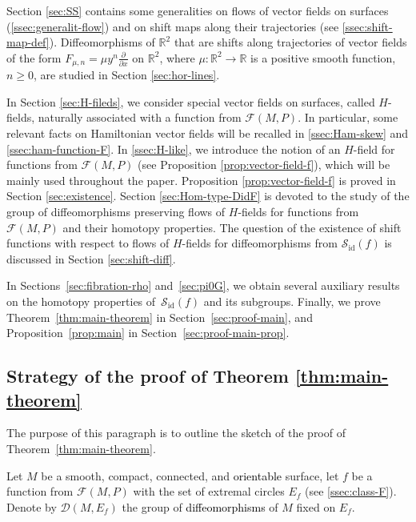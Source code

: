 \documentclass[10pt,reqno]{amsart}
\newcommand{\bbR}{\mathbb{R}}
\newcommand{\Sid}{\mathcal{S}_{\id}(f)}
\newcommand{\F}{\mathcal{F}(M,P)}
\newcommand{\id}{\mathrm{id}}
\newcommand{\textr}[1]{\textcolor{black}{#1}}
\begin{document}
Section \ref{sec:SS} contains some generalities on  flows of vector fields on surfaces (\textsection\ref{ssec:generalit-flow}) and on shift maps along their trajectories (see \textsection\ref{ssec:shift-map-def}).
Diffeomorphisms of $\bbR^2$ that are shifts along trajectories of vector fields of the form $F_{\mu,n} = \mu y^n\frac{\partial}{\partial x}$ on $\bbR^2$, where $\mu:\bbR^2\to \bbR$ is a positive smooth function, $n\geq 0$,  are studied in Section \ref{sec:hor-lines}.





In Section \ref{sec:H-fileds}, we consider special vector fields on surfaces, called $H$-fields, naturally associated with a function from $\F$. In particular,  some relevant facts on Hamiltonian vector fields will be recalled in \textsection\ref{ssec:Ham-skew} and \ref{ssec:ham-function-F}.
In \textsection\ref{ssec:H-like}, we introduce the notion of an $H$-field for functions from $\F$ (see Proposition \ref{prop:vector-field-f}), which will be mainly used throughout the paper.
Proposition  \ref{prop:vector-field-f} is proved in Section \ref{sec:existence}.
 Section \ref{sec:Hom-type-DidF} is devoted to the study of the group of diffeomorphisms preserving flows of $H$-fields for functions from $\F$ and their homotopy properties.
The question of the existence of shift functions with respect to  flows of  $H$-fields for diffeomorphisms from $\Sid$ is discussed in Section \ref{sec:shift-diff}. 


In Sections~\ref{sec:fibration-rho} and~\ref{sec:pi0G}, we obtain several auxiliary results on the homotopy properties of~$\mathcal{S}_{\mathrm{id}}(f)$ and its subgroups.
Finally, we prove Theorem~\ref{thm:main-theorem}  in Section~\ref{sec:proof-main}, and Proposition~\ref{prop:main} in Section~\ref{sec:proof-main-prop}.

\subsection{Strategy of the proof of Theorem \ref{thm:main-theorem}} 
The purpose of this paragraph is to outline the sketch of the proof of Theorem~\ref{thm:main-theorem}.

Let $M$ be a smooth, compact, connected, and \textr{orientable} surface, let $f$ be a function from $\F$
with the set of extremal circles $E_f$
 (see \textsection\ref{ssec:class-F}). Denote by $\mathcal{D}(M,E_f)$  the group of \textr{diffeomorphisms} of $M$ fixed on $E_f$.
\end{document}

